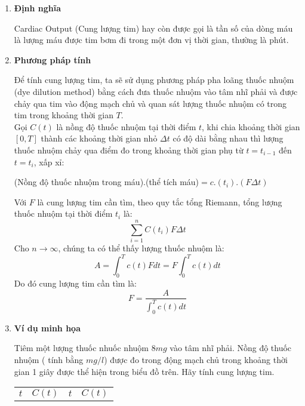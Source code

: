 \documentclass[12pt,a4paper]{article}
\begin{document}
\begin{enumerate}[a/]
	\item \textbf{Định nghĩa}
	      \begin{flushleft}
		      Cardiac Output (Cung lượng tim) hay còn được gọi là
		      tần số của dòng máu là lượng máu được tim bơm đi trong một đơn vị thời gian, thường là phút.
	      \end{flushleft}
	\item \textbf{Phương pháp tính}
	      \begin{flushleft}
		      Để tính cung lượng tim, ta sẽ sử dụng phương pháp pha loãng thuốc nhuộm
		      (dye dilution method) bằng cách đưa thuốc nhuộm vào tâm nhĩ phải và được
		      chảy qua tim vào động mạch chủ và quan sát lượng thuốc nhuộm có trong
		      tim trong khoảng thời gian $T$.\\
		      \vspace{1em}
		      Gọi $C(t)$ là nồng độ thuốc nhuộm tại thời điểm $t$, khi chia khoảng thời gian
		      $\left[0,T\right]$ thành các khoảng thời gian nhỏ $\Delta t$ có độ dài bằng
		      nhau thì lượng thuốc nhuộm chảy qua điểm đo trong khoảng thời gian phụ từ $t=t_{i-1}$ đến $t=t_i$, xấp xỉ:\\
		      \begin{center}
			      (Nồng độ thuốc nhuộm trong máu).(thể tích máu)$=c.(t_i).(F\Delta t)$
		      \end{center}
		      Với $F$ là cung lượng tim cần tìm, theo quy tắc tổng Riemann, tổng lượng thuốc nhuộm tại thời điểm $t_i$ là:
		      $$\sum_{i=1}^{n}C(t_i)F\Delta t$$
		      Cho $n \to \infty$, chúng ta có thể thấy lượng thuốc nhuộm là:
		      $$A=\int_{0}^{T}c(t)Fdt=F\int_{0}^{T}c(t)dt$$
		      Do đó cung lượng tim cần tìm là:
		      $$F=\frac{A}{\displaystyle \int_{0}^{T}c(t)dt}$$
	      \end{flushleft}
          \newpage
	\item \textbf{Ví dụ minh họa}
	      \begin{flushleft}
		      Tiêm một lượng thuốc nhuốc nhuộm $8mg$ vào tâm nhĩ phải. Nồng độ thuốc nhuộm ( tính bằng $mg/l$) được đo
		      trong động mạch chủ trong khoảng thời gian 1 giây được thể hiện trong biểu đồ trên.
		      Hãy tính cung lượng tim.
		      \begin{table}[H]
			      \centering
			      \def\arraystretch{1.2}
			      \begin{tabular}{|c|c|c|c|}
				      \hline
				      $t$ & $C(t)$ & $t$ & $C(t)$ \\

\end{tabular}
\end{table}
\end{flushleft}
\end{enumerate}
\end{document}
